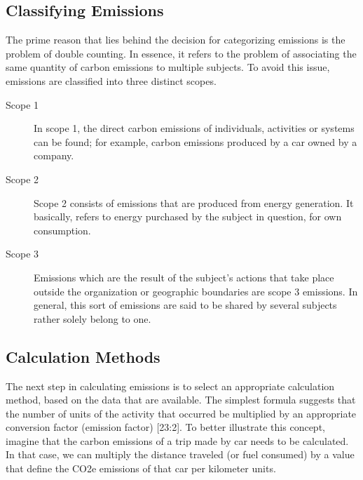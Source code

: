 \subsection{Classifying Emissions}
The prime reason that lies behind the decision for categorizing emissions is the problem of double counting. In essence, it refers to the problem of associating the same quantity of carbon emissions to multiple subjects\cite{reference23:25}. To avoid this issue, emissions are classified into three distinct scopes.

\begin{description}
  \item[Scope 1]
        In scope 1, the direct carbon emissions of individuals, activities or systems can be found; for example, carbon emissions produced by a car owned by a company.
  \item[Scope 2]
        Scope 2 consists of emissions that are produced from energy generation. It basically, refers to energy purchased by the subject in question, for own consumption.
  \item[Scope 3]
        Emissions which are the result of the subject's actions that take place outside the organization or geographic boundaries are scope 3 emissions. In general, this sort of emissions are said to be shared by several subjects rather solely belong to one.
\end{description}


\subsection{Calculation Methods}

The next step in calculating emissions is to select an appropriate calculation method, based on the data that are available. The simplest formula suggests that the number of units of the activity that occurred be multiplied by an appropriate conversion factor (emission factor) [23:2]. To better illustrate this concept, imagine that the carbon emissions of a trip made by car needs to be calculated. In that case, we can multiply the distance traveled (or fuel consumed) by a value that define the CO2e emissions of that car per kilometer units.

